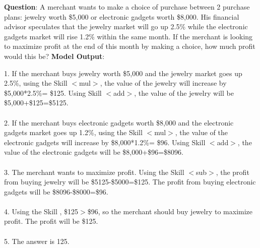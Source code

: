 \documentclass{article} %
\begin{document}
\newpage



\begin{tcolorbox}[title = {GSM8K}, colback = Apricot!25!white, colframe = BrickRed!75!black] 
\textbf{Question}: A merchant wants to make a choice of purchase between 2 purchase plans: jewelry worth \$5,000 or electronic gadgets worth \$8,000. His financial advisor speculates that the jewelry market will go up 2.5\% while the electronic gadgets market will rise 1.2\% within the same month. If the merchant is looking to maximize profit at the end of this month by making a choice, how much profit would this be?
\tcblower
\textbf{Model Output}:


\quad


1. If the merchant buys jewelry worth \$5,000 and the jewelry market goes up 2.5\%, using the Skill $<$mul$>$, the value of the jewelry will increase by \$5,000*2.5\%= \$125.  Using Skill $<$add$>$, the value of the jewelry will be \$5,000+\$125=\$5125. \\ \\
2. If the merchant buys electronic gadgets worth \$8,000 and the electronic gadgets market goes up 1.2\%, using the Skill $<$mul$>$, the value of the electronic gadgets will increase by \$8,000*1.2\%= \$96.  Using Skill $<$add$>$, the value of the electronic gadgets will be \$8,000+\$96=\$8096. \\ \\
3. The merchant wants to maximize profit. Using the Skill  $<$sub$>$,  the profit from buying jewelry will be \$5125-\$5000=\$125.  The profit from buying electronic gadgets will be \$8096-\$8000=\$96. \\ \\
4. Using the Skill , \$125$>$\$96, so the merchant should buy jewelry  to maximize profit. The profit will be \$125. \\ \\
5. The answer is 125.

\end{tcolorbox}
\noindent\begin{minipage}{\textwidth}
 \label{Tab:example_compose_gsm8k_skill_2}
\end{minipage}
\end{document}
